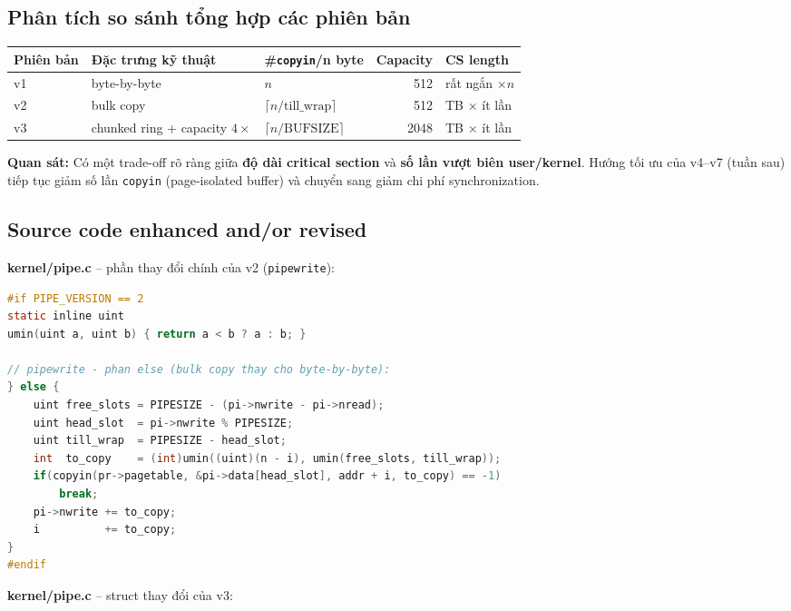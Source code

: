 \documentclass[11pt,a4paper]{article}
\begin{document}
\subsection{Phân tích so sánh tổng hợp các phiên bản}

\begin{center}
\begin{tabularx}{\linewidth}{lXlrl}
\toprule
\textbf{Phiên bản} & \textbf{Đặc trưng kỹ thuật} & \textbf{\#\texttt{copyin}/n byte} & \textbf{Capacity} & \textbf{CS length} \\
\midrule
v1 & byte-by-byte                      & $n$                                 & 512  & rất ngắn $\times n$ \\
v2 & bulk copy                         & $\lceil n/\text{till\_wrap} \rceil$ & 512  & TB $\times$ ít lần \\
v3 & chunked ring + capacity $4\times$ & $\lceil n/\text{BUFSIZE} \rceil$    & 2048 & TB $\times$ ít lần \\
\bottomrule
\end{tabularx}
\end{center}

\textbf{Quan sát:} Có một trade-off rõ ràng giữa \textbf{độ dài critical section} và \textbf{số lần vượt biên user/kernel}. Hướng tối ưu của v4--v7 (tuần sau) tiếp tục giảm số lần \texttt{copyin} (page-isolated buffer) và chuyển sang giảm chi phí synchronization.

\subsection{Source code enhanced and/or revised}

\textbf{kernel/pipe.c} -- phần thay đổi chính của v2 (\texttt{pipewrite}):

\begin{lstlisting}[language=C]
#if PIPE_VERSION == 2
static inline uint
umin(uint a, uint b) { return a < b ? a : b; }

// pipewrite - phan else (bulk copy thay cho byte-by-byte):
} else {
    uint free_slots = PIPESIZE - (pi->nwrite - pi->nread);
    uint head_slot  = pi->nwrite % PIPESIZE;
    uint till_wrap  = PIPESIZE - head_slot;
    int  to_copy    = (int)umin((uint)(n - i), umin(free_slots, till_wrap));
    if(copyin(pr->pagetable, &pi->data[head_slot], addr + i, to_copy) == -1)
        break;
    pi->nwrite += to_copy;
    i          += to_copy;
}
#endif
\end{lstlisting}

\textbf{kernel/pipe.c} -- struct thay đổi của v3:
\end{document}
